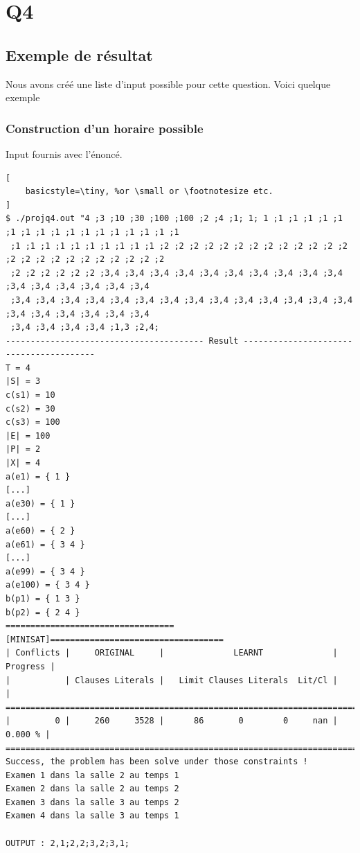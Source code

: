 \documentclass[a4paper,11pt]{article}
\begin{document}
\section{Q4}

\subsection{Exemple de résultat}
Nous avons créé une liste d'input possible pour cette question. Voici quelque exemple
\subsubsection{Construction d'un horaire possible}
Input fournis avec l'énoncé.
\begin{lstlisting}[
    basicstyle=\tiny, %or \small or \footnotesize etc.
]
$ ./projq4.out "4 ;3 ;10 ;30 ;100 ;100 ;2 ;4 ;1; 1; 1 ;1 ;1 ;1 ;1 ;1 ;1 ;1 ;1 ;1 ;1 ;1 ;1 ;1 ;1 ;1 ;1 ;1
 ;1 ;1 ;1 ;1 ;1 ;1 ;1 ;1 ;1 ;1 ;2 ;2 ;2 ;2 ;2 ;2 ;2 ;2 ;2 ;2 ;2 ;2 ;2 ;2 ;2 ;2 ;2 ;2 ;2 ;2 ;2 ;2 ;2 ;2 
 ;2 ;2 ;2 ;2 ;2 ;2 ;3,4 ;3,4 ;3,4 ;3,4 ;3,4 ;3,4 ;3,4 ;3,4 ;3,4 ;3,4 ;3,4 ;3,4 ;3,4 ;3,4 ;3,4 ;3,4 
 ;3,4 ;3,4 ;3,4 ;3,4 ;3,4 ;3,4 ;3,4 ;3,4 ;3,4 ;3,4 ;3,4 ;3,4 ;3,4 ;3,4 ;3,4 ;3,4 ;3,4 ;3,4 ;3,4 ;3,4 
 ;3,4 ;3,4 ;3,4 ;3,4 ;1,3 ;2,4;
---------------------------------------- Result ----------------------------------------
T = 4
|S| = 3
c(s1) = 10
c(s2) = 30
c(s3) = 100
|E| = 100
|P| = 2
|X| = 4
a(e1) = { 1 }
[...]
a(e30) = { 1 }
[...]
a(e60) = { 2 }
a(e61) = { 3 4 }
[...]
a(e99) = { 3 4 }
a(e100) = { 3 4 }
b(p1) = { 1 3 }
b(p2) = { 2 4 }
==================================[MINISAT]===================================
| Conflicts |     ORIGINAL     |              LEARNT              | Progress |
|           | Clauses Literals |   Limit Clauses Literals  Lit/Cl |          |
==============================================================================
|         0 |     260     3528 |      86       0        0     nan |  0.000 % |
==============================================================================
Success, the problem has been solve under those constraints !
Examen 1 dans la salle 2 au temps 1
Examen 2 dans la salle 2 au temps 2
Examen 3 dans la salle 3 au temps 2
Examen 4 dans la salle 3 au temps 1

OUTPUT : 2,1;2,2;3,2;3,1;
\end{lstlisting}
\end{document}
